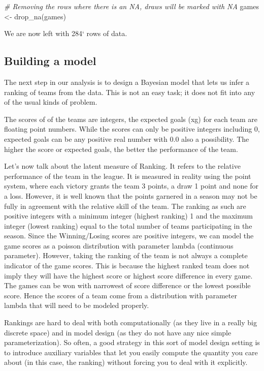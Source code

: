 \documentclass[
]{article}
\newenvironment{Shaded}{\begin{snugshade}}{\end{snugshade}}
\newcommand{\CommentTok}[1]{\textcolor[rgb]{0.56,0.35,0.01}{\textit{#1}}}
\newcommand{\FunctionTok}[1]{\textcolor[rgb]{0.00,0.00,0.00}{#1}}
\newcommand{\NormalTok}[1]{#1}
\newcommand{\OtherTok}[1]{\textcolor[rgb]{0.56,0.35,0.01}{#1}}
\begin{document}
\begin{Shaded}
\begin{Highlighting}[]
\CommentTok{\# Removing the rows where there is an NA, draws will be marked with NA}
\NormalTok{games }\OtherTok{\textless{}{-}} \FunctionTok{drop\_na}\NormalTok{(games)}
\end{Highlighting}
\end{Shaded}

We are now left with 284` rows of data.

\hypertarget{building-a-model}{%
\subsection{Building a model}\label{building-a-model}}

The next step in our analysis is to design a Bayesian model that lets us
infer a ranking of teams from the data. This is not an easy task; it
does not fit into any of the usual kinds of problem.

The scores of of the teams are integers, the expected goals (xg) for
each team are floating point numbers. While the scores can only be
positive integers including 0, expected goals can be any positive real
number with 0.0 also a possibility. The higher the score or expected
goals, the better the performance of the team.

Let's now talk about the latent measure of Ranking. It refers to the
relative performance of the team in the league. It is measured in
reality using the point system, where each victory grants the team 3
points, a draw 1 point and none for a loss. However, it is well known
that the points garnered in a season may not be fully in agreement with
the relative skill of the team. The ranking as such are positive
integers with a minimum integer (highest ranking) 1 and the maximum
integer (lowest ranking) equal to the total number of teams
participating in the season. Since the Winning/Losing scores are
positive integers, we can model the game scores as a poisson
distribution with parameter lambda (continuous parameter). However,
taking the ranking of the team is not always a complete indicator of the
game scores. This is because the highest ranked team does not imply they
will have the highest score or highest score difference in every game.
The games can be won with narrowest of score difference or the lowest
possible score. Hence the scores of a team come from a distribution with
parameter lambda that will need to be modeled properly.

Rankings are hard to deal with both computationally (as they live in a
really big discrete space) and in model design (as they do not have any
nice simple parameterization). So often, a good strategy in this sort of
model design setting is to introduce auxiliary variables that let you
easily compute the quantity you care about (in this case, the ranking)
without forcing you to deal with it explicitly.
\end{document}
